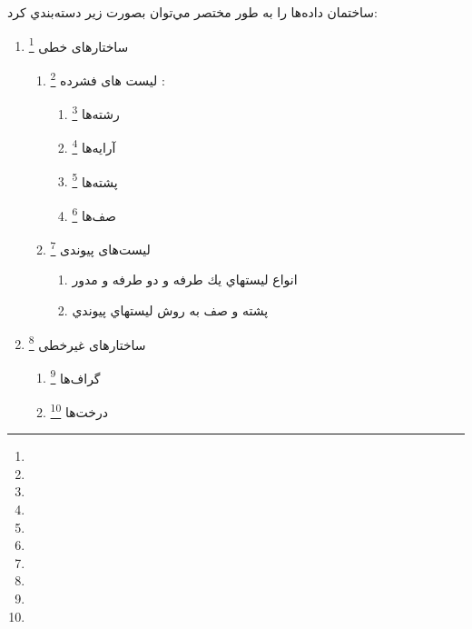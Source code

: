 \documentclass{book}
\begin{document}
 ساختمان داده‌ها را به طور مختصر مي‌توان بصورت زير دسته‌بندي كرد:
\begin{enumerate}
	\item
	 	ساختارهای خطی
	 	\footnote{}
	 	\begin{enumerate}
	 		\item 
	 		لیست های فشرده
	 		\footnote{}
	 		:
	 		\begin{enumerate}
	 			\item 
	 			رشته‌ها
	 				 	\footnote{}
	 			\item 
	 			آرایه‌ها
	 				 				 	\footnote{}
	 			\item 
	 			پشته‌ها
	 				 				 	\footnote{}
	 			\item 
	 			صف‌ها
	 				 				 	\footnote{}
	 		\end{enumerate}
 			\item 
 			لیست‌های پیوندی
 				 				 	\footnote{}
 			\begin{enumerate}
 				\item 
 			انواع ليستهاي يك طرفه و دو طرفه و مدور
 			  	\item 
 			پشته و صف به روش ليستهاي پيوندي 
 			
 			\end{enumerate}
	 	\end{enumerate}
 	\item 
 	ساختارهای غیر‌خطی
 		 				 	\footnote{}
 	\begin{enumerate}
 		\item
 		گراف‌ها
 			 				 	\footnote{}
 		\item 
 		درخت‌ها
 			 				 	\footnote{}
 	\end{enumerate}
\end{enumerate}
\end{document}
